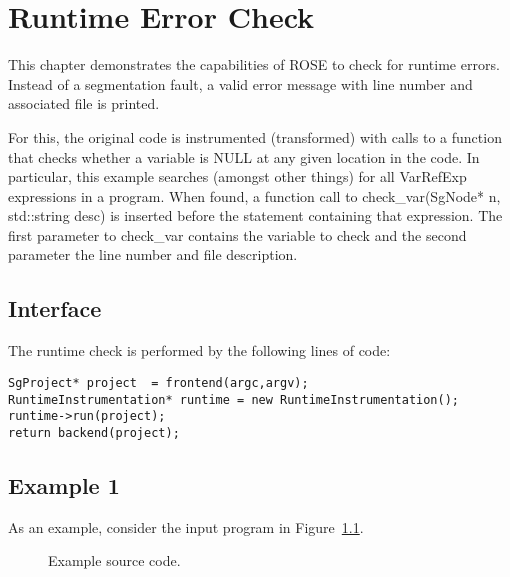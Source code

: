 \chapter{Runtime Error Check}

This chapter demonstrates the capabilities of ROSE to check for runtime errors. Instead of a segmentation fault,
a valid error message with line number and associated file is printed.

For this, the original code is instrumented (transformed) with calls to a function that checks whether a variable is NULL at 
any given location in the code. In particular, this example searches (amongst other things) for all VarRefExp expressions in a program.
When found, a function call to check\_var(SgNode* n, std::string desc) is inserted before the statement containing that expression.
The first parameter to check\_var contains the variable to check and the second parameter the line number and file description.

\section{Interface}

The runtime check is performed by the following lines of code:


\begin{verbatim}
SgProject* project  = frontend(argc,argv);
RuntimeInstrumentation* runtime = new RuntimeInstrumentation();
runtime->run(project);
return backend(project); 
\end{verbatim}


\section{Example 1}

As an example, consider the input program in Figure~\ref{Tutorial:exampleCode33}.

\begin{figure}[!h]
{\indent
{\mySmallFontSize
\begin{latexonly}
   
\end{latexonly}

\begin{htmlonly}
   
\end{htmlonly}

}
}
\caption{Example source code.}
\label{Tutorial:exampleCode33}
\end{figure}

